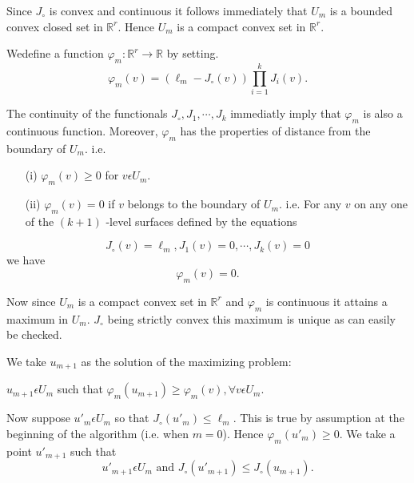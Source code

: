 Since $J_{\circ}$ is convex and continuous it follows immediately that $U_{m}$ is a bounded convex closed set in $\mathbb{R}^{r}$. Hence $U_{m}$ is a compact convex set in $\mathbb{R}^{r}$.

We\pageoriginale define a function $\varphi_{m} : \mathbb{R}^{r} \to \mathbb{R}$ by setting.
\begin{equation*}
\varphi_{m} (v) = (\ell_{m} - J_{\circ} (v)) \prod_{i=1}^{k} J_{i} (v).\tag{2.2}\label{chap4-eq2.2}
\end{equation*}

The continuity of the functionals $J_{\circ}, J_{1}, \cdots, J_{k}$ immediatly imply that $\varphi_{m}$ is also a continuous function. Moreover, $\varphi_{m}$ has the properties of distance from the boundary of $U_{m}$. i.e. 
\begin{enumerate}
\item[(i)] $\varphi_{m} (v) \geq 0$ for $v \epsilon U_{m}$.

\item[(ii)] $\varphi_{m}(v) = 0$ if $v$ belongs to the boundary of $U_{m}$. i.e. For any $v$ on any one of the $(k+1)$ -level surfaces defined by the equations
\end{enumerate}

$$
 J_{\circ} (v) = \ell_{m}, J_{1}(v) = 0, \cdots, J_{k}(v) = 0
$$
 we have
$$
  \varphi_{m}(v) = 0.
$$

Now since $U_{m}$ is a compact convex set in $\mathbb{R}^{r}$ and $\varphi_{m}$ is continuous it attains a maximum in $U_{m}$. $J_{\circ}$ being strictly convex this maximum is unique as can easily be checked.

We take $u_{m+1}$ as the solution of the maximizing problem:

\setcounter{uproblem}{1}
\begin{uproblem}\label{chap4-uprob2.2}
 $u_{m+1} \epsilon U_{m}$ such that $\varphi_{m} (u_{m+1}) \geq \varphi_{m} (v), \forall v \epsilon U_{m}$.

Now suppose $u'_{m} \epsilon U_{m}$ so that $J_{\circ} (u'_{m}) \leq \ell_{m}$. This is true by assumption at the beginning of the algorithm (i.e. when $m = 0$). Hence $\varphi_{m} (u'_{m}) \geq 0$. We take a point $u'_{m+1}$ such that
\begin{equation*}
u'_{m+1} \epsilon U_{m} \text{ and } J_{\circ} (u'_{m+1}) \leq J_{\circ} (u_{m+1}).\tag{2.3}\label{chap4-eq2.3}
\end{equation*}
\end{uproblem}

